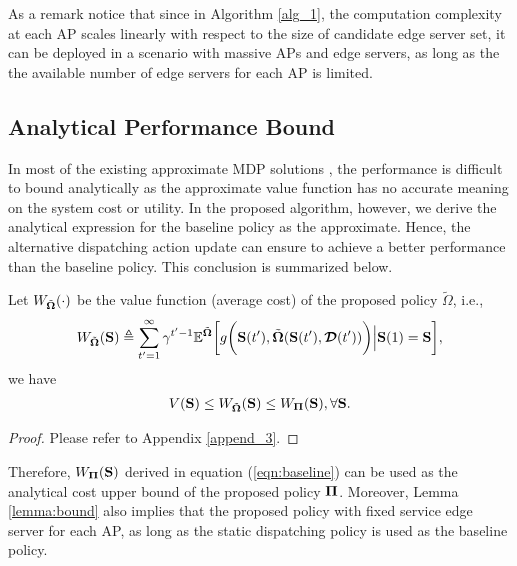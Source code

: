As a remark notice that since in Algorithm \ref{alg_1}, the computation complexity at each AP scales linearly with respect to {the size of candidate edge server set}, it can be deployed in a scenario with massive APs and edge servers, as long as the {the available number of edge servers for each AP} is limited.

\subsection{Analytical Performance Bound}
\label{subsec:analysis}
In most of the existing approximate MDP solutions \cite{mdp-bound1,mdp-bound2,mdp-bound3}, the performance is difficult to bound analytically as the approximate value function has no accurate meaning on the system cost or utility.
In the proposed algorithm, however, we derive the analytical expression for the baseline policy as the approximate.
Hence, the alternative dispatching action update can ensure to achieve a better performance than the baseline policy.
This conclusion is summarized below.
\begin{lemma}
    \label{lemma:bound}
    Let $W_{\tilde{\boldsymbol{\Omega}}}(\cdot)$ be the value function (average cost) of the proposed policy $\tilde{\Omega}$, i.e.,
    {\small
    \begin{align}
        W_{\tilde{\boldsymbol{\Omega}}}(\mathbf{S}) \triangleq
        \sum_{t'=1}^{\infty} \gamma^{t'-1} \mathbb{E}^{ \tilde{\boldsymbol{\Omega}} } \bigg[
            g\bigg(\mathbf{S}(t'), \tilde{\boldsymbol{\Omega}}(\mathbf{S}(t'),\boldsymbol{\mathcal{D}}(t'))\bigg) \Big| \mathbf{S}(1)=\mathbf{S}
        \bigg],
    \end{align}
    }
    we have
    {\small
    \begin{align}
        V(\mathbf{S})
        \leq W_{\tilde{\boldsymbol{\Omega}}}(\mathbf{S})
        \leq W_{\boldsymbol{\Pi}}(\mathbf{S}),
        \forall \mathbf{S}.
    \end{align}
    }
\end{lemma}
\begin{proof}
    Please refer to Appendix \ref{append_3}.
\end{proof}
Therefore, $W_{\boldsymbol{\Pi}}(\mathbf{S})$ derived in equation (\ref{eqn:baseline}) can be used as the analytical cost upper bound of the proposed policy $\boldsymbol{\Pi}$.
Moreover, Lemma \ref{lemma:bound} also implies that the proposed policy with fixed service edge server for each AP, as long as the {static dispatching policy} is used as the baseline policy.

